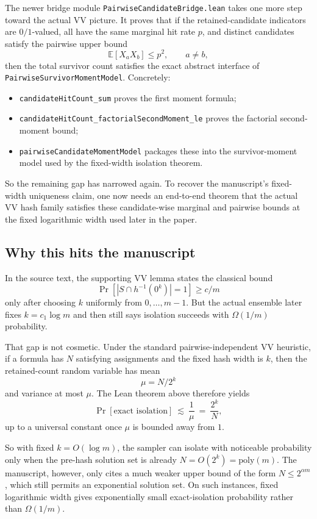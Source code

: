 \documentclass[11pt]{article}
\theoremstyle{remark}
\begin{document}
The newer bridge module \texttt{PairwiseCandidateBridge.lean} takes one more step toward the actual
VV picture.  It proves that if the retained-candidate indicators are \(0/1\)-valued, all have the
same marginal hit rate \(p\), and distinct candidates satisfy the pairwise upper bound
\[
  \mathbb E[X_a X_b] \le p^2,
  \qquad a\neq b,
\]
then the total survivor count satisfies the exact abstract interface of
\texttt{PairwiseSurvivorMomentModel}.  Concretely:
\begin{itemize}[leftmargin=1.5em]
  \item \texttt{candidateHitCount\_sum} proves the first moment formula;
  \item \texttt{candidateHitCount\_factorialSecondMoment\_le} proves the factorial second-moment
  bound;
  \item \texttt{pairwiseCandidateMomentModel} packages these into the survivor-moment model used by
  the fixed-width isolation theorem.
\end{itemize}

So the remaining gap has narrowed again.  To recover the manuscript's fixed-width uniqueness claim,
one now needs an end-to-end theorem that the actual VV hash family satisfies these candidate-wise
marginal and pairwise bounds at the fixed logarithmic width used later in the paper.

\subsection{Why this hits the manuscript}

In the source text, the supporting VV lemma states the classical bound
\[
  \Pr[|S\cap h^{-1}(0^k)|=1]\ge c/m
\]
only after choosing \(k\) uniformly from \(0,\dots,m-1\).  But the actual ensemble later fixes
\(k=c_1\log m\) and then still says isolation succeeds with \(\Omega(1/m)\) probability.

That gap is not cosmetic.  Under the standard pairwise-independent VV heuristic, if a formula has
\(N\) satisfying assignments and the fixed hash width is \(k\), then the retained-count random
variable has mean
\[
  \mu = N/2^k
\]
and variance at most \(\mu\).  The Lean theorem above therefore yields
\[
  \Pr[\text{exact isolation}]
  \ \lesssim\
  \frac{1}{\mu}
  \ =\
  \frac{2^k}{N},
\]
up to a universal constant once \(\mu\) is bounded away from \(1\).

So with fixed \(k=O(\log m)\), the sampler can isolate with noticeable probability only when the
pre-hash solution set is already \(N=O(2^k)=\mathrm{poly}(m)\).  The manuscript, however, only
cites a much weaker upper bound of the form \(N\le 2^{\alpha m}\), which still permits an
exponential solution set.  On such instances, fixed logarithmic width gives exponentially small
exact-isolation probability rather than \(\Omega(1/m)\).
\end{document}
